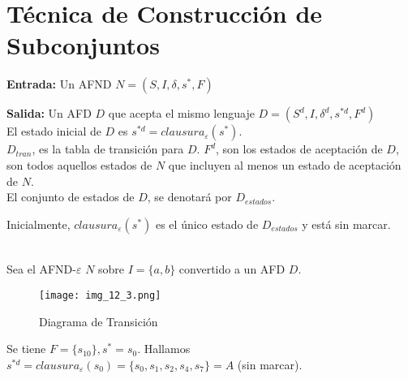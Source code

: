 \section{Técnica de Construcción de Subconjuntos}

\textbf{Entrada: }Un AFND $N=(S,I,\delta,s^*,F)$

\textbf{Salida: }Un AFD $D$ que acepta el mismo lenguaje $D=(S^d,I,\delta^d,s^{*d},F^d)$\\

El estado inicial de $D$ es $s^{*d}=clausura_\varepsilon(s^*)$.\\

$D_{tran}$, es la tabla de transición para $D$. $F^d$, son los estados de aceptación de $D$, son todos aquellos estados de $N$ que incluyen al menos un estado de aceptación de $N$.\\

El conjunto de estados de $D$, se denotará por $D_{estados}$.

Inicialmente, $clausura_\varepsilon(s^*)$ es el único estado de $D_{estados}$ y está sin marcar.\\
\\

\begin{algorithm}

\end{algorithm}

Sea el AFND-$\varepsilon$ $N$ sobre $I=\{a,b\}$ convertido a un AFD $D$.
\begin{figure}[h!]
\centering
\texttt{[image: img\_12\_3.png]}
\caption{Diagrama de Transición}\label{img_12_3}
\end{figure}

Se tiene $F=\{s_{10}\}, s^*=s_0$. Hallamos $s^{*d}=clausura_\varepsilon(s_0)=\{s_0,s_1,s_2,s_4,s_7\}=A$ (sin marcar).

